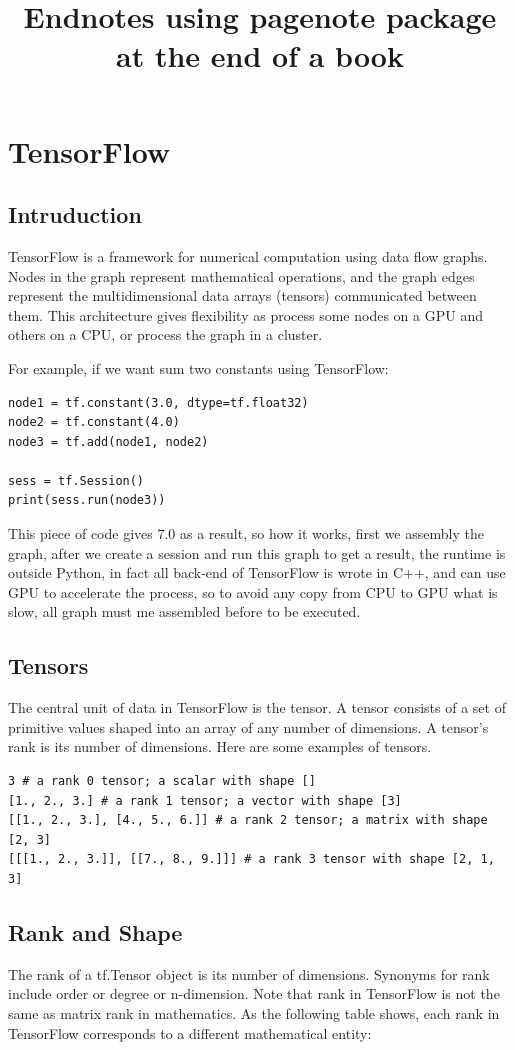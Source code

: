 \documentclass[11pt,openany]{book}
\title{Endnotes using pagenote package at the end of a book}
\begin{document}
\chapter{TensorFlow}
\section{Intruduction}
TensorFlow is a framework for numerical computation using data flow graphs. Nodes in the graph represent mathematical operations, and the graph edges represent the multidimensional data arrays (tensors) communicated between them. This architecture gives flexibility as process some nodes on a GPU and others on a CPU, or process the graph in a cluster.

For example, if we want sum two constants using TensorFlow:

\begin{verbatim}
node1 = tf.constant(3.0, dtype=tf.float32)
node2 = tf.constant(4.0)
node3 = tf.add(node1, node2)

sess = tf.Session()
print(sess.run(node3))
\end{verbatim}

This piece of code gives 7.0 as a result, so how it works, first we assembly the graph, after we create a session and run this graph to get a result, the runtime is outside Python, in fact all back-end of TensorFlow is wrote in C++, and can use GPU to accelerate the process, so to avoid any copy from CPU to GPU what is slow, all graph must me assembled before to be executed.

\section{Tensors}
The central unit of data in TensorFlow is the tensor. A tensor consists of a set of primitive values shaped into an array of any number of dimensions. A tensor's rank is its number of dimensions. Here are some examples of tensors.

\begin{verbatim}
3 # a rank 0 tensor; a scalar with shape []
[1., 2., 3.] # a rank 1 tensor; a vector with shape [3]
[[1., 2., 3.], [4., 5., 6.]] # a rank 2 tensor; a matrix with shape [2, 3]
[[[1., 2., 3.]], [[7., 8., 9.]]] # a rank 3 tensor with shape [2, 1, 3]
\end{verbatim}

\section{Rank and Shape}
The rank of a tf.Tensor object is its number of dimensions. Synonyms for rank include order or degree or n-dimension. Note that rank in TensorFlow is not the same as matrix rank in mathematics. As the following table shows, each rank in TensorFlow corresponds to a different mathematical entity:
\end{document}
